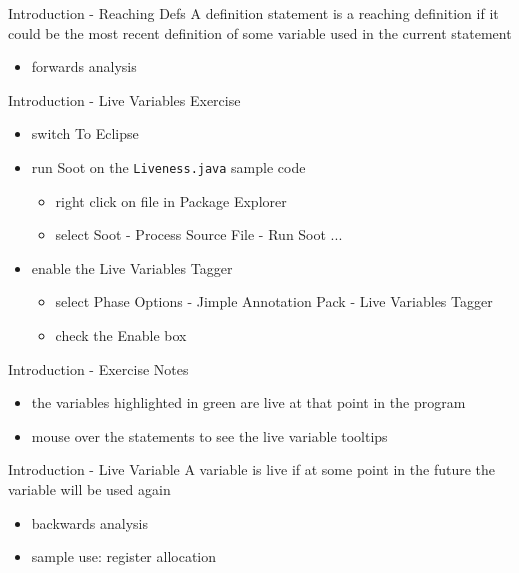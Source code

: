 \documentclass[mcgill,slideColor,colorBG,pdf]{prosper}
\begin{document}
\begin{slide} {Introduction - Reaching Defs}
A definition statement is a reaching definition if it could be the most recent definition of some variable used in the current statement %
\begin{itemize}
\item forwards analysis
\end{itemize}
\end{slide}

\begin{slide} {Introduction - Live Variables Exercise}
\begin{itemize}
\item switch To Eclipse
\item run Soot on the \texttt{Liveness.java} sample code
\begin{itemize}
\item right click on file in Package Explorer
\item select Soot - Process Source File - Run Soot ...
\end{itemize}
\item enable the Live Variables Tagger
\begin{itemize}
\item select Phase Options - Jimple Annotation Pack - Live Variables Tagger
\item check the Enable box
\end{itemize}
\end{itemize}

\end{slide}

\begin{slide} {Introduction - Exercise Notes}
\begin{itemize}
\item the variables highlighted in green are live at that point in the program
\item mouse over the statements to see the live variable tooltips
\end{itemize}
\end{slide}

\begin{slide} {Introduction - Live Variable}
A variable is live if at some point in the future the variable will be used again %
\begin{itemize}
\item backwards analysis
\item sample use: register allocation
\end{itemize}
\end{slide}
\end{document}
